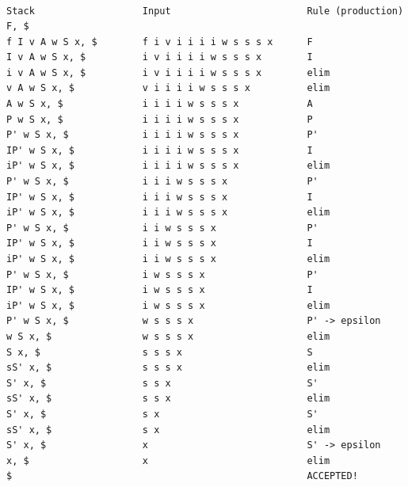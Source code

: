 \subsubsection{}
\begin{lstlisting}

Stack                   Input                        Rule (production)
F, $ 
f I v A w S x, $        f i v i i i i w s s s x      F
I v A w S x, $          i v i i i i w s s s x        I
i v A w S x, $          i v i i i i w s s s x        elim
v A w S x, $            v i i i i w s s s x          elim
A w S x, $              i i i i w s s s x            A
P w S x, $              i i i i w s s s x            P
P' w S x, $             i i i i w s s s x            P'
IP' w S x, $            i i i i w s s s x            I
iP' w S x, $            i i i i w s s s x            elim
P' w S x, $             i i i w s s s x              P'
IP' w S x, $            i i i w s s s x              I
iP' w S x, $            i i i w s s s x              elim
P' w S x, $             i i w s s s x                P'
IP' w S x, $            i i w s s s x                I
iP' w S x, $            i i w s s s x                elim
P' w S x, $             i w s s s x                  P'
IP' w S x, $            i w s s s x                  I
iP' w S x, $            i w s s s x                  elim
P' w S x, $             w s s s x                    P' -> epsilon
w S x, $                w s s s x                    elim
S x, $                  s s s x                      S
sS' x, $                s s s x                      elim
S' x, $                 s s x                        S'
sS' x, $                s s x                        elim
S' x, $                 s x                          S'
sS' x, $                s x                          elim
S' x, $                 x                            S' -> epsilon
x, $                    x                            elim
$                                                    ACCEPTED!

\end{lstlisting}
